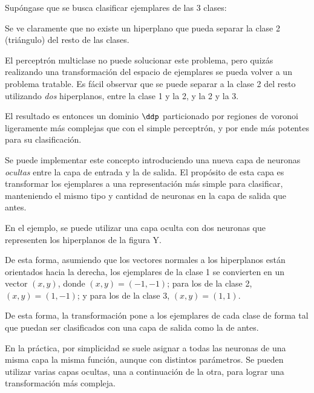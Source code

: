 Supóngase que se busca clasificar ejemplares de las 3 clases:  


Se ve claramente que no existe un hiperplano que pueda separar la clase 2 (triángulo) del resto de las clases. 

El perceptrón multiclase no puede solucionar este problema, pero quizás realizando una transformación del espacio de ejemplares se pueda volver a un problema tratable. Es fácil observar que se puede separar a la clase 2 del resto utilizando \textit{dos} hiperplanos, entre la clase 1 y la 2, y la 2 y la 3.



El resultado es entonces un dominio $\ddp$ particionado por regiones de voronoi ligeramente más complejas que con el simple perceptrón, y por ende más potentes para su clasificación.

Se puede implementar este concepto introduciendo una nueva capa de neuronas \textit{ocultas} entre la capa de entrada y la de salida. El propósito de esta capa es transformar los ejemplares a una representación más simple para clasificar, manteniendo el mismo tipo y cantidad de neuronas en la capa de salida que antes. 


En el ejemplo, se puede utilizar una capa oculta con dos neuronas que representen los hiperplanos de la figura Y.

De esta forma, asumiendo que los vectores normales a los hiperplanos están orientados hacia la derecha, los ejemplares de la clase 1 se convierten en un vector $(x,y)$, donde $(x,y)=(-1,-1)$; para los de la clase 2, $(x,y)=(1,-1)$; y para los de la clase 3, $(x,y)=(1,1)$. 



De esta forma, la transformación pone a los ejemplares de cada clase de forma tal que puedan ser clasificados con una capa de salida como la de antes.

En la práctica, por simplicidad se suele asignar a todas las neuronas de una misma capa la misma función, aunque con distintos parámetros. Se pueden utilizar varias capas ocultas, una a continuación de la otra, para lograr una transformación más compleja. 

